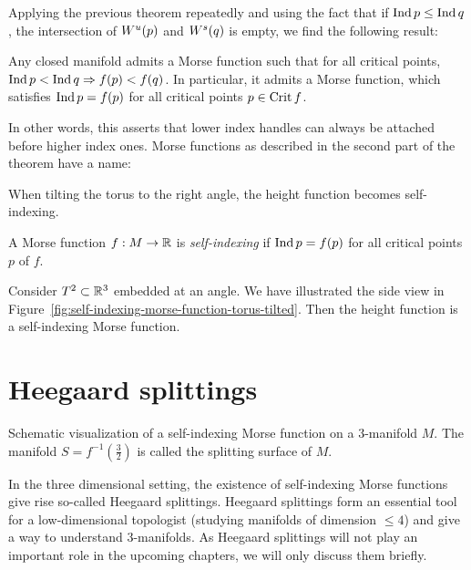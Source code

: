 Applying the previous theorem repeatedly and using the fact that if $\operatorname{Ind} p \le  \operatorname{Ind} q$, the intersection of $W^u(p)$ and  $W^s(q)$ is empty, we find the following result:

\begin{theorem}
    Any closed manifold admits a Morse function such that for all critical points, $\operatorname{Ind} p < \operatorname{Ind} q \Rightarrow f(p) < f(q)$.
    In particular, it admits a Morse function, which satisfies $ \operatorname{Ind} p  = f(p) $ for all critical points $p \in \operatorname{Crit} f$.
\end{theorem}
In other words, this asserts that lower index handles can always be attached before higher index ones.
Morse functions as described in the second part of the theorem have a name:
\begin{marginfigure}
    \centering
    \caption{When tilting the torus to the right angle, the height function becomes self-indexing.}
    \label{fig:self-indexing-morse-function-torus-tilted}
\end{marginfigure}
\begin{definition}
    A Morse function $f: M \to  \mathbb{R}$ is \emph{self-indexing} if $\operatorname{Ind} p = f(p)$ for all critical points  $p$ of  $f$.
\end{definition}
\begin{eg}
    Consider $T^2 \subset \mathbb{R}^3$ embedded at an angle. We have illustrated the side view in Figure~\ref{fig:self-indexing-morse-function-torus-tilted}.
    Then the height function is a self-indexing Morse function.
\end{eg}

\section{Heegaard splittings}
\begin{marginfigure}
    \centering
    \caption{Schematic visualization of a self-indexing Morse function on a $3$-manifold $M$.
        The manifold $S = f^{-1}(\frac{3}{2})$ is called the splitting surface of $M$.
    }
    \label{fig:heegaard-splittings-schemattically}
\end{marginfigure}
In the three dimensional setting, the existence of self-indexing Morse functions give rise so-called Heegaard splittings.
Heegaard splittings form an essential tool for a low-dimensional topologist (studying manifolds of dimension $\le 4$) and give a way to understand $3$-manifolds.
As Heegaard splittings will not play an important role in the upcoming chapters, we will only discuss them briefly.



